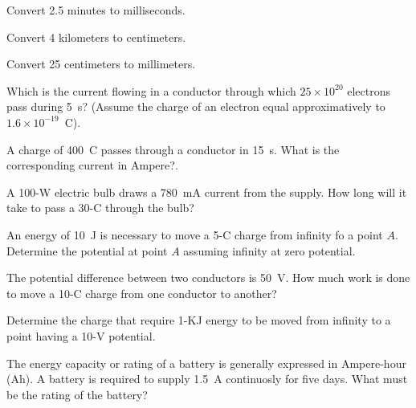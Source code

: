 \begin{problem}
Convert 2.5 minutes to milliseconds.
\end{problem}

\begin{problem}
Convert 4 kilometers to centimeters.
\end{problem}

\begin{problem}
Convert 25 centimeters to millimeters.
\end{problem}

\begin{problem}
Which is the current flowing in a conductor through which $25 \times 10^{20}$ electrons pass during 5~s? (Assume the charge of an electron equal approximatively to $1.6 \times 10^{-19}$~C).
\end{problem}

\begin{problem}
A charge of 400~C passes through a conductor in 15~s. What is the corresponding current in Ampere?.
\end{problem}

\begin{problem}
A 100-W electric bulb draws a 780~mA current from the supply. How long will it take to pass a 30-C through the bulb? 
\end{problem}

\begin{problem}
An energy of 10~J is necessary to move a 5-C charge from infinity fo a point $A$. Determine the potential at point $A$ assuming infinity at zero potential. 
\end{problem}

\begin{problem}
The potential difference between two conductors is 50~V. How much work is done to move a 10-C charge from one conductor to another?
\end{problem}

\begin{problem}
Determine the charge that require 1-KJ energy to be moved from infinity to a point having a 10-V potential.
\end{problem}

\begin{problem}
The energy capacity or rating of a battery is generally expressed in Ampere-hour (Ah). A battery is required to supply 1.5~A continuosly for five days. What must be the rating of the battery?
\end{problem}


